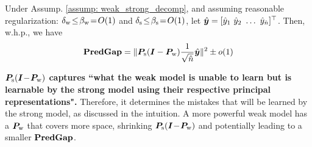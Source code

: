 \begin{theorem}\label{thm: main_theorem}
Under Assump. \ref{assump: weak_strong_decomp}, and assuming reasonable regularization: $\delta_{\text{w}}\!\leq\!\beta_{\text{w}}\! =\!O(1)$ and $\delta_{\text{s}}\!\leq\!\beta_{\text{s}} \!=\!O(1)$, let $ \hat{{\bm{y}}}=[ \hat{y}_1~\hat{y}_2~\dots~\hat{y}_{\hat{n}} ]^\top $. Then, w.h.p., we have
\begin{equation}
\label{eq: pred_gap_equal}
   \textbf{PredGap} =  \| {\bm{P}}_{\text{s}} ({\bm{I}} -{\bm{P}}_{\text{w}} ) \frac{1}{\sqrt{\hat{n}}} \hat{{\bm{y}}}  \|^2 \pm o(1) 
\end{equation}
\end{theorem}
\textbf{${\bm{P}}_{\text{s}}({\bm{I}}\!-\!{\bm{P}}_{\text{w}})$ captures ``what the weak model is unable to learn but is learnable by the strong model using their respective principal representations".} Therefore, it determines the mistakes that will be learned by the strong model, as discussed in the intuition. A more powerful weak model has a ${\bm{P}}_{\text{w}}$ that covers more space, shrinking ${\bm{P}}_{\text{s}}({\bm{I}}\!-\!{\bm{P}}_{\text{w}})$ and potentially leading to a smaller $\textbf{PredGap}{}$.

